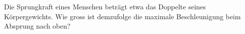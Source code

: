 Die Sprungkraft eines Menschen beträgt etwa das Doppelte seines Körpergewichts. Wie gross ist demzufolge die maximale Beschleunigung beim Absprung nach oben?
